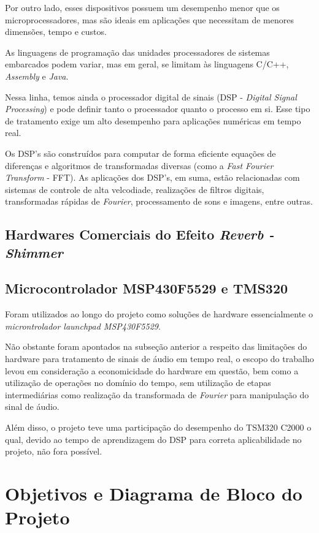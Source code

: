 		Por outro lado, esses dispositivos possuem um desempenho menor que os microprocessadores, mas são ideais em aplicações que necessitam de menores dimensões, tempo e custos.
		
		As linguagens de programação das unidades processadores de sistemas embarcados podem variar, mas em geral, se limitam às linguagens C/C++, \textit{Assembly} e \textit{Java}.
		
		Nessa linha, temos ainda o processador digital de sinais (DSP - \textit{Digital Signal Processing}) e pode definir tanto o processador quanto o processo em si. Esse tipo de tratamento exige um alto desempenho para aplicações numéricas em tempo real.
		
		Os DSP's são construídos para computar de forma eficiente equações de diferenças e algoritmos de transformadas diversas (como a \textit{Fast Fourier Transform} - FFT). As aplicações dos DSP's, em suma, estão relacionadas com sistemas de controle de alta velcodiade, realizações de filtros digitais, transformadas rápidas de \textit{Fourier}, processamento de sons e imagens, entre outras.

	\subsection{Hardwares Comerciais do Efeito \textit{Reverb - Shimmer}}
	
	\subsection{Microcontrolador MSP430F5529 e TMS320}
	
	Foram utilizados ao longo do projeto como soluções de hardware essencialmente o \textit{microntrolador launchpad MSP430F5529}.
	
	Não obstante foram apontados na subseção anterior a respeito das limitações do hardware para tratamento de sinais de áudio em tempo real, o escopo do trabalho levou em consideração a economicidade do hardware em questão, bem como a utilização de operações no domínio do tempo, sem utilização de etapas intermediárias como realização da transformada de \textit{Fourier} para manipulação do sinal de áudio. %
	
	Além disso, o projeto teve uma participação do desempenho do TSM320 C2000 o qual, devido ao tempo de aprendizagem do DSP para correta aplicabilidade no projeto, não fora possível. %


\section{Objetivos e Diagrama de Bloco do Projeto}

